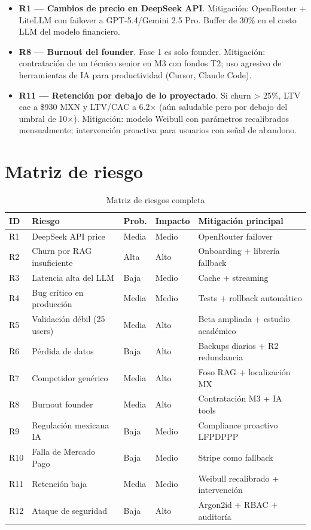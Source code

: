 \documentclass[10pt,a4paper,oneside]{report}
\begin{document}
\begin{itemize}[leftmargin=1.4em]
\item \textbf{R1 — Cambios de precio en DeepSeek API}. Mitigación: OpenRouter + LiteLLM con failover a GPT-5.4/Gemini 2.5 Pro. Buffer de 30\% en el costo LLM del modelo financiero.
\item \textbf{R8 — Burnout del founder}. Fase 1 es solo founder. Mitigación: contratación de un técnico senior en M3 con fondos T2; uso agresivo de herramientas de IA para productividad (Cursor, Claude Code).
\item \textbf{R11 — Retención por debajo de lo proyectado}. Si churn > 25\%, LTV cae a \$930 MXN y LTV/CAC a 6.2× (aún saludable pero por debajo del umbral de 10×). Mitigación: modelo Weibull con parámetros recalibrados mensualmente; intervención proactiva para usuarios con señal de abandono.
\end{itemize}

\section{Matriz de riesgo}

\begin{table}[H]
\centering
\begin{tabular}{p{1cm}p{5cm}p{2cm}p{2cm}p{3.5cm}}
\toprule
\textbf{ID} & \textbf{Riesgo} & \textbf{Prob.} & \textbf{Impacto} & \textbf{Mitigación principal} \\
\midrule
R1 & DeepSeek API price & Media & Medio & OpenRouter failover \\
R2 & Churn por RAG insuficiente & Alta & Alto & Onboarding + librería fallback \\
R3 & Latencia alta del LLM & Baja & Medio & Cache + streaming \\
R4 & Bug crítico en producción & Media & Medio & Tests + rollback automático \\
R5 & Validación débil (25 users) & Media & Alto & Beta ampliada + estudio académico \\
R6 & Pérdida de datos & Baja & Alto & Backups diarios + R2 redundancia \\
R7 & Competidor genérico & Media & Alto & Foso RAG + localización MX \\
R8 & Burnout founder & Media & Alto & Contratación M3 + IA tools \\
R9 & Regulación mexicana IA & Baja & Medio & Compliance proactivo LFPDPPP \\
R10 & Falla de Mercado Pago & Baja & Medio & Stripe como fallback \\
R11 & Retención baja & Media & Medio & Weibull recalibrado + intervención \\
R12 & Ataque de seguridad & Baja & Alto & Argon2id + RBAC + auditoría \\
\bottomrule
\end{tabular}
\caption{Matriz de riesgos completa}
\end{table}
\end{document}
